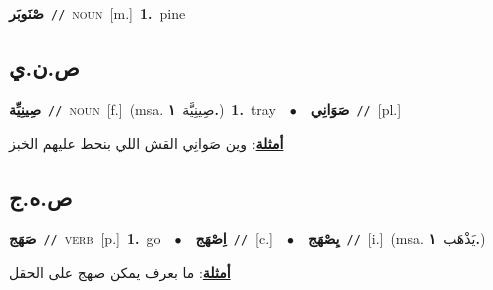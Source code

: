 \documentclass[10pt,a4paper,twoside]{article} %
\begin{document}
\begin{multicols}{2}
{\setlength\topsep{0pt}\textbf{\foreignlanguage{arabic}{صْنَوبَر}}\ {\color{gray}\texttt{//}\color{black}}\ \textsc{noun}\ [m.]\ \textbf{1.}~pine\ } \vspace{2mm}

\vspace{-3mm}
\subsection*{\color{blue}\foreignlanguage{arabic}{ص.ن.ي}\color{blue}{}} 

{\setlength\topsep{0pt}\textbf{\foreignlanguage{arabic}{صِينِيِّة}}\ {\color{gray}\texttt{//}\color{black}}\ \textsc{noun}\ [f.]\ \color{gray}(msa. \foreignlanguage{arabic}{صِينِيَّة}~\foreignlanguage{arabic}{\textbf{١.}})\color{black}\ \textbf{1.}~tray\ \ $\bullet$\ \ \setlength\topsep{0pt}\textbf{\foreignlanguage{arabic}{صَوَانِي}}\ {\color{gray}\texttt{//}\color{black}}\ [pl.]\  \begin{flushright}\color{gray}\foreignlanguage{arabic}{\textbf{\underline{\foreignlanguage{arabic}{أمثلة}}}: وين صَوانِي القش اللي بنحط عليهم الخبز}\end{flushright}\color{black}} \vspace{2mm}

\vspace{-3mm}
\subsection*{\color{blue}\foreignlanguage{arabic}{ص.ه.ج}\color{blue}{}} 

{\setlength\topsep{0pt}\textbf{\foreignlanguage{arabic}{صَهَج}}\ {\color{gray}\texttt{//}\color{black}}\ \textsc{verb}\ [p.]\ \textbf{1.}~go\ \ $\bullet$\ \ \setlength\topsep{0pt}\textbf{\foreignlanguage{arabic}{اِصْهَج}}\ {\color{gray}\texttt{//}\color{black}}\ [c.]\ \ $\bullet$\ \ \setlength\topsep{0pt}\textbf{\foreignlanguage{arabic}{يِصْهَج}}\ {\color{gray}\texttt{//}\color{black}}\ [i.]\ \color{gray}(msa. \foreignlanguage{arabic}{يَذْهَب}~\foreignlanguage{arabic}{\textbf{١.}})\color{black}\  \begin{flushright}\color{gray}\foreignlanguage{arabic}{\textbf{\underline{\foreignlanguage{arabic}{أمثلة}}}: ما بعرف يمكن صهج على الحقل}\end{flushright}\color{black}} \vspace{2mm}


\end{multicols}
\end{document}
